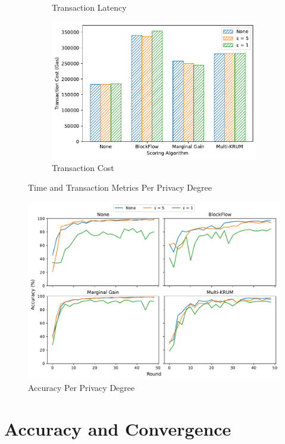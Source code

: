 \begin{figure}[!hpt]
\begin{subfigure}[b]{0.47\textwidth}
        \caption{Transaction Latency}
    \end{subfigure}
    \hfill
    \begin{subfigure}[b]{0.47\textwidth}
        \centering
        \includegraphics[width=\textwidth]{graphics/privacy/tx_cost.pdf}
        \caption{Transaction Cost}
    \end{subfigure}
    \caption{Time and Transaction Metrics Per Privacy Degree}
    \label{fig:priv_metrics}
\end{figure}

\begin{figure}[!hpb]
    \centering
    \includegraphics[width=\textwidth]{graphics/privacy/accuracy.pdf}
    \caption{Accuracy Per Privacy Degree}
    \label{fig:accuracy_privacy}
\end{figure}

\section{Accuracy and Convergence}

